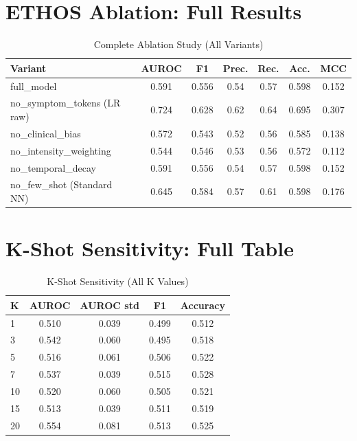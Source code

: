 \section{ETHOS Ablation: Full Results}

\begin{table}[htbp]
\centering
\caption{Complete Ablation Study (All Variants)}
\begin{tabular}{lcccccc}
\toprule
Variant & AUROC & F1 & Prec. & Rec. & Acc. & MCC \\
\midrule
full\_model & 0.591 & 0.556 & 0.54 & 0.57 & 0.598 & 0.152 \\
no\_symptom\_tokens (LR raw) & 0.724 & 0.628 & 0.62 & 0.64 & 0.695 & 0.307 \\
no\_clinical\_bias & 0.572 & 0.543 & 0.52 & 0.56 & 0.585 & 0.138 \\
no\_intensity\_weighting & 0.544 & 0.546 & 0.53 & 0.56 & 0.572 & 0.112 \\
no\_temporal\_decay & 0.591 & 0.556 & 0.54 & 0.57 & 0.598 & 0.152 \\
no\_few\_shot (Standard NN) & 0.645 & 0.584 & 0.57 & 0.61 & 0.598 & 0.176 \\
\bottomrule
\end{tabular}
\label{tab:ablation_full}
\end{table}

\section{K-Shot Sensitivity: Full Table}

\begin{table}[htbp]
\centering
\caption{K-Shot Sensitivity (All K Values)}
\begin{tabular}{lcccc}
\toprule
K & AUROC & AUROC std & F1 & Accuracy \\
\midrule
1 & 0.510 & 0.039 & 0.499 & 0.512 \\
3 & 0.542 & 0.060 & 0.495 & 0.518 \\
5 & 0.516 & 0.061 & 0.506 & 0.522 \\
7 & 0.537 & 0.039 & 0.515 & 0.528 \\
10 & 0.520 & 0.060 & 0.505 & 0.521 \\
15 & 0.513 & 0.039 & 0.511 & 0.519 \\
20 & 0.554 & 0.081 & 0.513 & 0.525 \\
\bottomrule
\end{tabular}
\label{tab:kshot_full}
\end{table}

